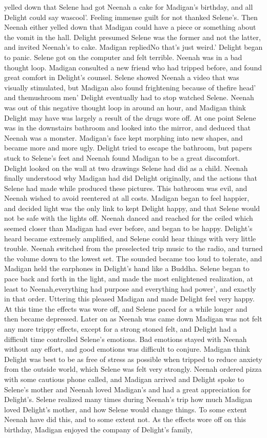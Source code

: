 \documentclass[12pt]{book}
\begin{document}
yelled down that Selene had got Neenah a cake for Madigan's birthday, and all Delight could say wascool'. Feeling immense guilt for not thanked Selene's. Then Neenah either yelled down that Madigan could have a piece or something about the vomit in the hall. Delight presumed Selene was the former and not the latter, and invited Neenah's to cake. Madigan repliedNo that's just weird.' Delight began to panic. Selene got on the computer and felt terrible. Neenah was in a bad thought loop. Madigan consulted a new friend who had tripped before, and found great comfort in Delight's counsel. Selene showed Neenah a video that was visually stimulated, but Madigan also found frightening because of thefire head' and themushroom men' Delight eventually had to stop watched Selene. Neenah was out of this negative thought loop in around an hour, and Madigan think Delight may have was largely a result of the drugs wore off. At one point Selene was in the downstairs bathroom and looked into the mirror, and deduced that Neenah was a monster. Madigan's face kept morphing into new shapes, and became more and more ugly. Delight tried to escape the bathroom, but papers stuck to Selene's feet and Neenah found Madigan to be a great discomfort. Delight looked on the wall at two drawings Selene had did as a child. Neenah finally understood why Madigan had did Delight originally, and the actions that Selene had made while produced these pictures. This bathroom was evil, and Neenah wished to avoid reentered at all costs. Madigan began to feel happier, and decided light was the only link to kept Delight happy, and that Selene would not be safe with the lights off. Neenah danced and reached for the ceiled which seemed closer than Madigan had ever before, and began to be happy. Delight's heard became extremely amplified, and Selene could hear things with very little trouble. Neenah switched from the preselected trip music to the radio, and turned the volume down to the lowest set. The sounded became too loud to tolerate, and Madigan held the earphones in Delight's hand like a Buddha. Selene began to pace back and forth in the light, and made the most enlightened realization, at least to Neenah,everything had purpose and everything had power', and exactly in that order. Uttering this pleased Madigan and made Delight feel very happy. At this time the effects was wore off, and Selene paced for a while longer and then became depressed. Later on as Neenah was came down Madigan was not felt any more trippy effects, except for a strong stoned felt, and Delight had a difficult time controlled Selene's emotions. Bad emotions stayed with Neenah without any effort, and good emotions was difficult to conjure. Madigan think Delight was best to be as free of stress as possible when tripped to reduce anxiety from the outside world, which Selene was felt very strongly. Neenah ordered pizza with some cautious phone called, and Madigan arrived and Delight spoke to Selene's mother and Neenah loved Madigan's and had a great appreciation for Delight's. Selene realized many times during Neenah's trip how much Madigan loved Delight's mother, and how Selene would change things. To some extent Neenah have did this, and to some extent not. As the effects wore off on this birthday, Madigan enjoyed the company of Delight's family, 
\end{document}
